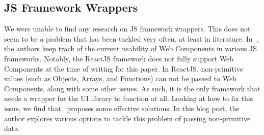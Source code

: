 \subsection{JS Framework Wrappers}
We were unable to find any research on JS framework wrappers. This does not seem to be a problem that has been tackled very often, at least in literature. In~\cite{custom-elements-everyhwere}, the authors keep track of the current usability of Web Components in various JS frameworks. Notably, the ReactJS framework does not fully support Web Components at the time of writing for this paper. In ReactJS, non-primitive values (such as Objects, Arrays, and Functions) can not be passed to Web Components, along with some other issues. As such, it is the only framework that needs a wrapper for the UI library to function at all. Looking at how to fix this issue, we find that~\cite{remdt_2019} proposes some effective solutions. In this blog post, the author explores various options to tackle this problem of passing non-primitive data.